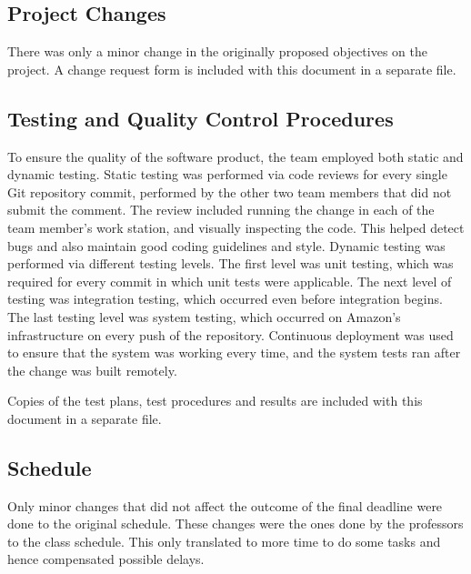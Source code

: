 \subsection{Project Changes}
There was only a minor change in the originally proposed objectives on the project. A change request form is included with this document in a separate file.
   
\subsection{Testing and Quality Control Procedures}

To ensure the quality of the software product, the team employed both static
and dynamic testing. Static testing was performed via code reviews for every
single Git repository commit, performed by the other two team members
that did not submit the comment. The review included running the change in each of the team
member's work station, and visually inspecting the code. This helped detect
bugs and also maintain good coding guidelines and style. Dynamic testing was
performed via different testing levels. The first level was unit testing,
which was required for every commit in which unit tests were applicable. The next level of testing was integration testing, which occurred even before integration begins. The last testing level was system
testing, which occurred on Amazon's infrastructure on every push of the
repository. Continuous deployment was used to ensure
that the system was working every time, and the system tests ran after the
change was built remotely.

Copies of the test plans, test procedures and results are included with this document in a separate file.

\subsection{Schedule}

Only minor changes that did not affect the outcome of the final deadline were done to the original schedule. These changes were the ones done by the professors to the class schedule. This only translated to more time to do some tasks and hence compensated possible delays.